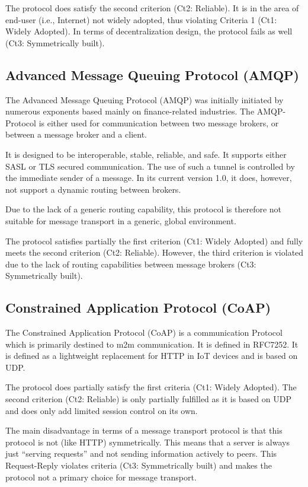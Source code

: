 The protocol does satisfy the second criterion (Ct2: Reliable). It is in the area of end-user (i.e., Internet) not widely adopted, thus violating Criteria 1 (Ct1: Widely Adopted). In terms of decentralization design, the protocol fails as well (Ct3: Symmetrically built).

\subsection{Advanced Message Queuing Protocol (AMQP)}
The Advanced Message Queuing Protocol (AMQP) was initially initiated by numerous exponents based mainly on finance-related industries. The AMQP-Protocol is either used for communication between two message brokers, or between a message broker and a client\cite{amqp}.

It is designed to be interoperable, stable, reliable, and safe. It supports either SASL or TLS secured communication. The use of such a tunnel is controlled by the immediate sender of a message. In its current version 1.0, it does, however, not support a dynamic routing between brokers\cite{amqp}.

Due to the lack of a generic routing capability, this protocol is therefore not suitable for message transport in a generic, global environment.

The protocol satisfies partially the first criterion (Ct1: Widely Adopted) and fully meets the second criterion (Ct2: Reliable). However, the third criterion is violated due to the lack of routing capabilities between message brokers (Ct3: Symmetrically built).

\subsection{Constrained Application Protocol (CoAP)}
The Constrained Application Protocol (CoAP) is a communication Protocol which is primarily destined to m2m communication. It is defined in RFC7252\cite{RFC7252}.  It is defined as a lightweight replacement for HTTP in IoT devices and is based on UDP.

The protocol does partially satisfy the first criteria (Ct1: Widely Adopted). The second criterion (Ct2: Reliable) is only partially fulfilled as it is based on UDP and does only add limited session control on its own.

The main disadvantage in terms of a message transport protocol is that this protocol is not (like HTTP) symmetrically. This means that a server is always just ``serving requests'' and not sending information actively to peers. This Request-Reply violates criteria (Ct3: Symmetrically built) and makes the protocol not a primary choice for message transport. 

